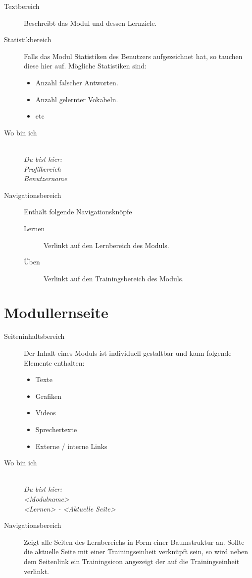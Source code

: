 \begin{description}
  \item[Textbereich] Beschreibt das Modul und dessen Lernziele.
  \item[Statistikbereich] 
    Falls das Modul Statistiken des Benutzers aufgezeichnet hat, so tauchen diese hier auf. Mögliche Statistiken sind:
    \begin{itemize}
      \item Anzahl falscher Antworten.
      \item Anzahl gelernter Vokabeln.
      \item etc
    \end{itemize}
  \item[Wo bin ich] 
    \emph{\\Du bist hier:\\Profilbereich\\Benutzername}
  \item[Navigationsbereich] Enthält folgende Navigationsknöpfe \\
   \begin{description}
    \item[Lernen] Verlinkt auf den Lernbereich des Moduls.
    \item[Üben] Verlinkt auf den Trainingsbereich des Moduls.
   \end{description}
\end{description}

%
%
%
\section{Modullernseite}
\label{sec:hauptseite}

\begin{description}
  \item[Seiteninhaltsbereich] Der Inhalt eines Moduls ist individuell gestaltbar und kann folgende Elemente enthalten:
  \begin{itemize}
    \item Texte
    \item Grafiken
    \item Videos
    \item Sprechertexte
    \item Externe / interne Links
  \end{itemize}
  
  \item[Wo bin ich] \emph{\\Du bist hier:\\<Modulname>\\<Lernen> - <Aktuelle Seite>}
  \item[Navigationsbereich] Zeigt alle Seiten des Lernbereichs in Form einer Baumstruktur an. Sollte die aktuelle Seite mit einer Trainingseinheit verknüpft sein, so wird neben dem Seitenlink ein Trainingsicon angezeigt %
  der auf die Trainingseinheit verlinkt.
  
\end{description}


